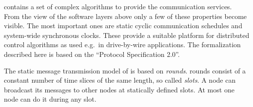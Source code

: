 \fr contains a set of complex algorithms to provide the communication
services. From the view of the software layers above \fr only a few 
of these properties become visible. The most important ones are static 
cyclic communication schedules and system-wide synchronous clocks. 
These provide a suitable platform for distributed control algorithms 
as used e.g.\ in drive-by-wire applications. The formalization described 
here is based on the ``Protocol Specification 2.0''\cite{FlexRayProt}.
 
The static message transmission model of \fr is based
on \textit{rounds}. \fr rounds consist of a constant number of
time slices of the same length, so called \emph{slots}.
A node can broadcast its messages to other nodes at
statically defined slots. At most one node can
do it during any slot.

